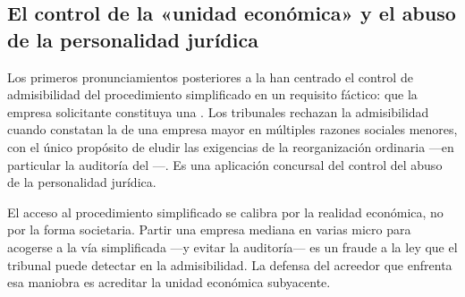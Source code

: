\bloqueJurisprudencial

\subsection{El control de la «unidad económica» y el abuso de la personalidad jurídica}

Los primeros pronunciamientos posteriores a la \Lreforma{} han centrado el control de admisibilidad
del procedimiento simplificado en un requisito fáctico: que la empresa solicitante constituya una
. Los tribunales rechazan la admisibilidad cuando
constatan la  de una empresa mayor en múltiples razones sociales
menores, con el único propósito de eludir las exigencias de la reorganización ordinaria ---en
particular la auditoría del ---. Es una aplicación concursal del control del abuso de la
personalidad jurídica.

\begin{foco}
El acceso al procedimiento simplificado se calibra por la realidad económica, no por la forma
societaria. Partir una empresa mediana en varias micro para acogerse a la vía simplificada ---y
evitar la auditoría--- es un fraude a la ley que el tribunal puede detectar en la admisibilidad. La
defensa del acreedor que enfrenta esa maniobra es acreditar la unidad económica subyacente.
\end{foco}
